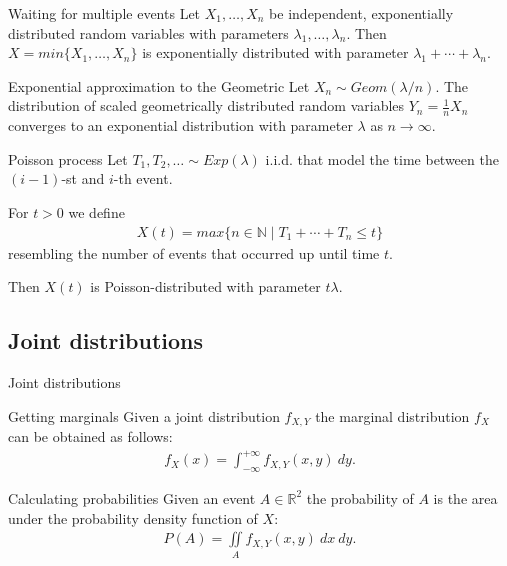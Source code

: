 \documentclass{beamer}
\def\padding{\vspace{0.5cm}}
\begin{document}
\begin{frame}
    \begin{block}{Waiting for multiple events}
        Let $X_1, \dots, X_n$ be independent, exponentially distributed random variables with parameters $\lambda_1, \dots, \lambda_n$. Then $X = min \{X_1, \dots, X_n\}$ is exponentially distributed with parameter $\lambda_1 + \cdots + \lambda_n$.
    \end{block}\pause\par\padding
    \begin{block}{Exponential approximation to the Geometric}
        Let $X_n \sim Geom(\lambda / n)$. The distribution of scaled geometrically distributed random variables $Y_n = \frac{1}{n} X_n$ converges to an exponential distribution with parameter $\lambda$ as $n \to \infty$.
    \end{block}
\end{frame}

\begin{frame}
    \begin{block}{Poisson process}
        Let $T_1, T_2, \ldots \sim Exp(\lambda)$ i.i.d. that model the time between the $(i - 1)$-st and $i$-th event.\pause\par
        For $t > 0$ we define
        \begin{align*}
            X(t) = max \{n \in \mathbb{N} \mid T_1 + \cdots + T_n \leq t\}
        \end{align*}
        resembling the number of events that occurred up until time $t$.\pause\par
        Then $X(t)$ is Poisson-distributed with parameter $t \lambda$.
    \end{block}
\end{frame}

\subsection{Joint distributions}
\begin{frame}{Joint distributions}
    \begin{block}{Getting marginals}
        Given a joint distribution $f_{X,Y}$ the marginal distribution $f_X$ can be obtained as follows:
        \begin{align*}
            f_X(x) = \int_{- \infty}^{+ \infty} f_{X,Y}(x,y)\ dy.
        \end{align*}
    \end{block}\pause\par\padding
    \begin{block}{Calculating probabilities}
        Given an event $A \in \mathbb{R}^2$ the probability of $A$ is the area under the probability density function of $X$:
        \begin{align*}
            P(A) = \iint\limits_{A} f_{X,Y}(x,y)\ dx\ dy.
        \end{align*}
    \end{block}
\end{frame}
\end{document}
